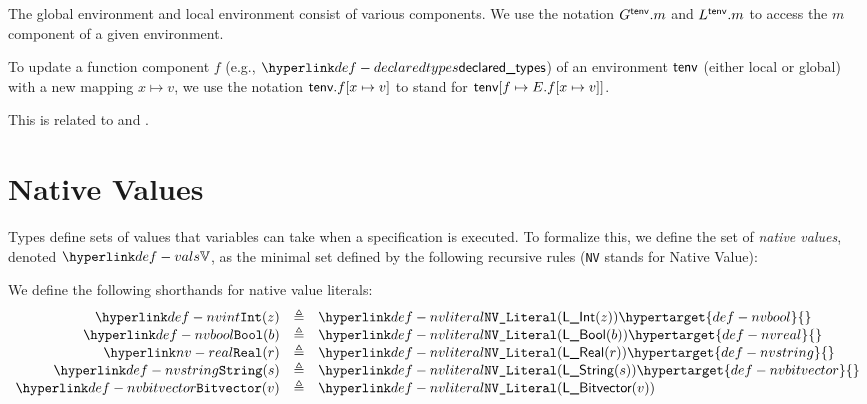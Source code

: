 \documentclass{book}
\begin{document}
The global environment and local environment consist of various components.
We use the notation $G^{\textsf{tenv}}.m$ and $L^{\textsf{tenv}}.m$ to access the $m$ component of a given environment.

To update a function component $f$ (e.g., $\declaredtypes$) of an environment $\textsf{tenv}$ (either local or global)
with a new mapping $x \mapsto v$, we use the notation $\textsf{tenv}.f[x \mapsto v]$ to stand for $\textsf{tenv}[f \mapsto E.f[x \mapsto v]]$.

This is related to  and .

\hypertarget{def-vals}{}
\section{Native Values \label{sec:nativevalues}}

Types define sets of values that variables can take when a specification is executed.
To formalize this, we define the set of \emph{native values}, denoted $\vals$,
as the minimal set defined by the following recursive rules (\texttt{NV} stands for Native Value):
\hypertarget{def-nvliteral}{}
\hypertarget{def-nvvector}{}
\hypertarget{def-nvrecord}{}

We define the following shorthands for native value literals:
\hypertarget{def-nvint}{}
\[
\begin{array}{rcl}
\nvint(z)       &\triangleq& \nvliteral{\lint(z)}           \hypertarget{def-nvbool}{}\\
\nvbool(b)      &\triangleq& \nvliteral{\lbool(b)}          \hypertarget{def-nvreal}{}\\
\nvreal(r)      &\triangleq& \nvliteral{\lreal(r)}          \hypertarget{def-nvstring}{}\\
\nvstring(s)    &\triangleq& \nvliteral{\lstring(s)}        \hypertarget{def-nvbitvector}{}\\
\nvbitvector(v) &\triangleq& \nvliteral{\lbitvector(v)}\\
\end{array}
\]
\end{document}

